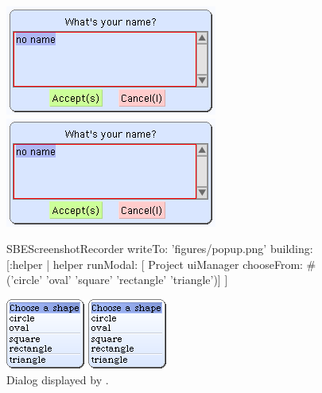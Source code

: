 \documentclass[a4paper,10pt,twoside]{book}
\begin{document}
\begin{figure}[htb]
\begin{minipage}{0.45\textwidth}
	\ifluluelse
		{\centerline{\includegraphics[scale=0.65]{dialog}}}
		{\centerline{\includegraphics[width=\textwidth]{dialog}}}
	\caption{Dialog displayed by .
		\label{fig:dialogName}}
\end{minipage}
\hfill
\begin{ExecuteSmalltalkScript}
SBEScreenshotRecorder writeTo: 'figures/popup.png' building: [:helper |
	helper runModal: [
		Project uiManager
			chooseFrom: #('circle' 'oval' 'square' 'rectangle' 'triangle')]
]
\end{ExecuteSmalltalkScript}
\begin{minipage}{0.45\textwidth}
	\vfill
	\ifluluelse
		{\centerline{\includegraphics [scale=0.65]{popup}}}
		{\centerline{\includegraphics[width=\textwidth]{popup}}}

\end{minipage}
\end{figure}
\end{document}
